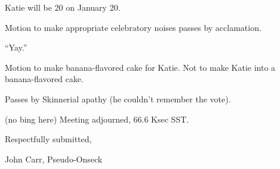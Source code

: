 \documentclass[10pt]{article}
\newcommand{\bing}{{(no bing here)} }
\newcommand{\goto}[1]{\bing \vskip 12pt \section*{{\em{#1}}}}
\begin{document}
Katie will be 20 on January 20.

Motion to make appropriate celebratory noises passes by acclamation.

``Yay.''

Motion to make banana-flavored cake for Katie.  Not to make
Katie into a banana-flavored cake.

Passes by Skinnerial apathy (he couldn't remember the vote).


\bing
\noindent
Meeting adjourned, 66.6 Ksec SST.

\vspace{18pt}

\centerline{Respectfully submitted,}
\centerline{John Carr, Pseudo-Onseck}
\end{document}
